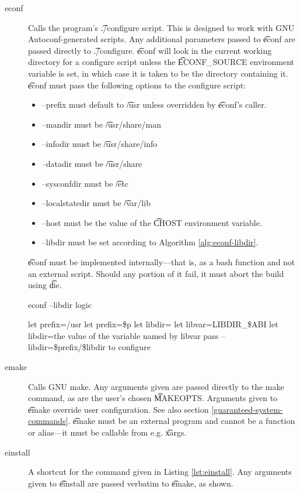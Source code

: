 \begin{description}
\item[econf] Calls the program's \t{./configure} script. This is designed to work with GNU
    Autoconf-generated scripts. Any additional parameters passed to \t{econf} are passed directly
    to \t{./configure}. \t{econf} will look in the current working directory for a configure script
    unless the \t{ECONF\_SOURCE} environment variable is set, in which case it is taken to be the
    directory containing it. \t{econf} must pass the following options to the configure script:
    \begin{itemize}
    \item --prefix must default to \t{/usr} unless overridden by \t{econf}'s caller.
    \item --mandir must be \t{/usr/share/man}
    \item --infodir must be \t{/usr/share/info}
    \item --datadir must be \t{/usr/share}
    \item --sysconfdir must be \t{/etc}
    \item --localstatedir must be \t{/var/lib}
    \item --host must be the value of the \t{CHOST} environment variable.
    \item --libdir must be set according to Algorithm \ref{alg:econf-libdir}.
    \end{itemize}

    \t{econf} must be implemented internally---that is, as a bash function and not an external
    script. Should any portion of it fail, it must abort the build using \t{die}.

\begin{algorithm}
\caption{econf --libdir logic} \label{alg:econf-libdir}
\begin{algorithmic}[1]
\STATE let prefix=/usr
    \STATE let prefix=\$p
\ENDIF
\STATE let libdir=
    \STATE let libvar=LIBDIR\_\$ABI
        \STATE let libdir=the value of the variable named by libvar
    \ENDIF
\ENDIF
{}
    \STATE pass --libdir=\$prefix/\$libdir to configure
\ENDIF
\end{algorithmic}
\end{algorithm}

\item[emake] Calls GNU make. Any arguments given are passed directly to the make
    command, as are the user's chosen \t{MAKEOPTS}. Arguments given to \t{emake} override user
    configuration. See also section \ref{guaranteed-system-commands}. \t{emake} must be an external
    program and cannot be a function or alias---it must be callable from e.g. \t{xargs}.
\item[einstall] A shortcut for the command given in Listing \ref{lst:einstall}. Any arguments given
    to \t{einstall} are passed verbatim to \t{emake}, as shown.


\end{description}
